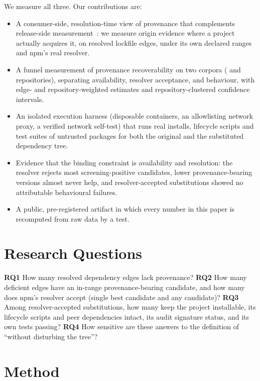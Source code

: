 \documentclass[conference]{IEEEtran}
\begin{document}
We measure all three. Our contributions are:
\begin{itemize}
\item A consumer-side, resolution-time view of provenance that complements
  release-side measurement~\cite{santos2026authority}: we measure origin
  evidence where a project actually acquires it, on resolved lockfile edges,
  under its own declared ranges and npm's real resolver.
\item A funnel measurement of provenance recoverability on two corpora
  (\POneRepos{} and \SRepos{} repositories), separating availability, resolver
  acceptance, and behaviour, with edge- and repository-weighted estimates and
  repository-clustered confidence intervals.
\item An isolated execution harness (disposable containers, an
  allowlisting network proxy, a verified network self-test) that runs real
  installs, lifecycle scripts and test suites of untrusted packages for both
  the original and the substituted dependency tree.
\item Evidence that the binding constraint is availability and resolution:
  the resolver rejects most screening-positive candidates, lower
  provenance-bearing versions almost never help, and resolver-accepted
  substitutions showed no attributable behavioural failures.
\item A public, pre-registered artifact in which every number in this paper
  is recomputed from raw data by a test.
\end{itemize}

\section{Research Questions}
\textbf{RQ1} How many resolved dependency edges lack provenance?
\textbf{RQ2} How many deficient edges have an in-range provenance-bearing
candidate, and how many does npm's resolver accept (single best candidate and
any candidate)?
\textbf{RQ3} Among resolver-accepted substitutions, how many keep the project
installable, its lifecycle scripts and peer dependencies intact, its audit
signature status, and its own tests passing?
\textbf{RQ4} How sensitive are these answers to the definition of ``without
disturbing the tree''?

\section{Method}
\end{document}
